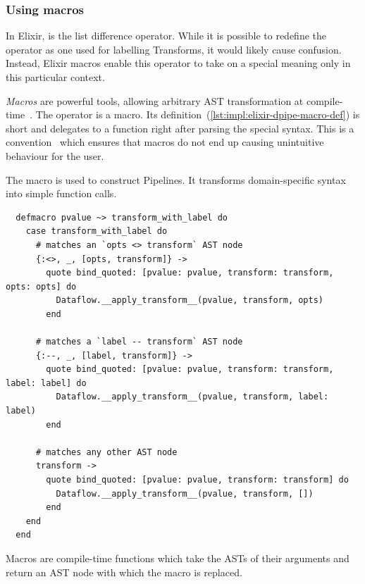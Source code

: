 \subsubsection{Using macros}

In Elixir, \exs{--} is the list difference operator.
While it is possible to redefine the \exs{--} operator as one used for labelling Transforms, it would likely cause confusion.
Instead, Elixir macros enable this operator to take on a special meaning only in this particular context.

\emph{Macros} are powerful tools, allowing arbitrary AST transformation at compile-time~\cite[p.~13]{Elixir-Metaprogramming}.
The \exs{~>} operator is a macro.
Its definition~(\cref{lst:impl:elixir-dpipe-macro-def}) is short and delegates to a function right after parsing the special syntax.
This is a convention~\cite[p.~7]{Elixir-Metaprogramming} which ensures that macros do not end up causing unintuitive behaviour for the user.

\begin{listing}[h]
	\caption[The definition of the \exs{~>} macro for constructing Pipelines.]{The \exs{~>} macro is used to construct Pipelines. It transforms domain-specific syntax into simple function calls.}
	\label{lst:impl:elixir-dpipe-macro-def}
	\begin{verbatim}
  defmacro pvalue ~> transform_with_label do
    case transform_with_label do
      # matches an `opts <> transform` AST node
      {:<>, _, [opts, transform]} ->
        quote bind_quoted: [pvalue: pvalue, transform: transform, opts: opts] do
          Dataflow.__apply_transform__(pvalue, transform, opts)
        end
        
      # matches a `label -- transform` AST node
      {:--, _, [label, transform]} ->
        quote bind_quoted: [pvalue: pvalue, transform: transform, label: label] do
          Dataflow.__apply_transform__(pvalue, transform, label: label)
        end
      
      # matches any other AST node
      transform ->
        quote bind_quoted: [pvalue: pvalue, transform: transform] do
          Dataflow.__apply_transform__(pvalue, transform, [])
        end
    end
  end
	\end{verbatim}
\end{listing}

Macros are compile-time functions which take the ASTs of their arguments and return an AST node with which the macro is replaced.

